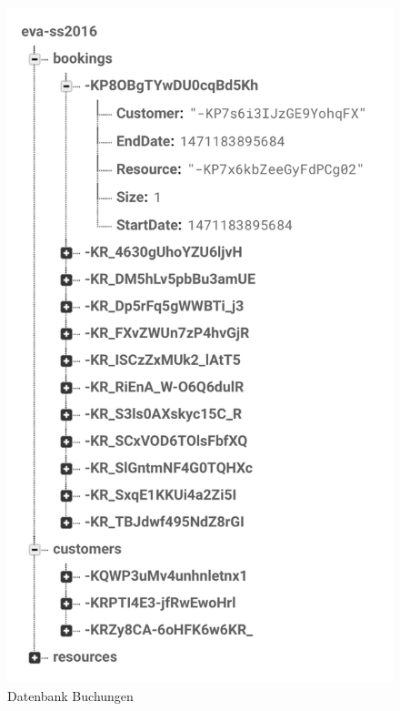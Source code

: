\begin{figure}[H]
    \centering
    \begin{minipage}[t]{0.32\linewidth}
        \centering
        \includegraphics[width=\linewidth]{images/backend_database_bookings.png}
        \caption{Datenbank Buchungen}
        \label{backend_database_bookings}
    \end{minipage}%
    \hfill
    \begin{minipage}[t]{0.32\linewidth}
        \centering

\end{minipage}
\end{figure}
